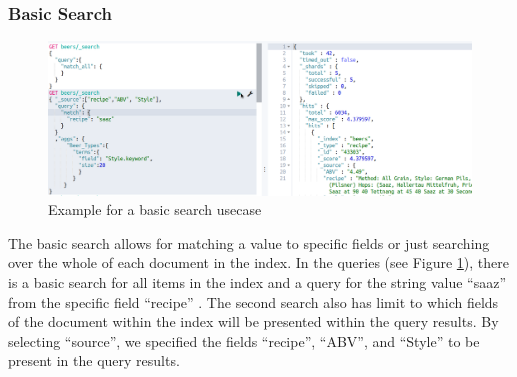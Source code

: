 \documentclass[bibliography=totoc]{article}
\begin{document}
\subsubsection{Basic Search}
\begin{figure}
    \includegraphics[height=0.4\textwidth]{basic_search.png}
    \caption{\label{beer_basic_search}Example for a basic search usecase} 
 \end{figure}
 The basic search allows for matching a value to specific fields or just searching over 
 the whole of each document in the index. 
 In the queries (see Figure \ref{beer_basic_search}), there is a basic search for all items in the 
 index and a query for the string value “saaz” from the specific field 
 “recipe” . The second search also has limit to which fields of 
the document within the index will be presented within the query 
results. By selecting “source”, we specified the fields “recipe”, 
 “ABV”, and “Style” to be present in the query results.  
\end{document}
